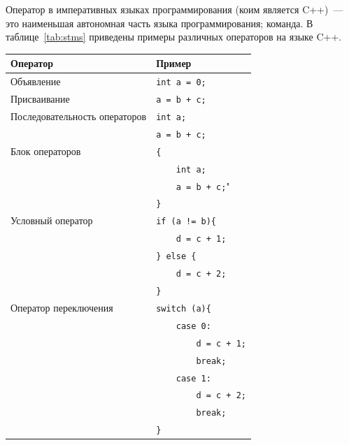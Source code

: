 Оператор в императивных языках программирования (коим является {\sf C++})~--- это наименьшая автономная часть языка программирования; команда. В таблице~\ref{tab:stms} приведены примеры различных операторов на языке {\sf C++}.
\begin{table}
    \begin{center}
        \begin{tabular}{|l|l|}
            \hline
            Оператор & Пример\\
            \hline
            Объявление & \verb"int a = 0;"\\
            \hline
            Присваивание & \verb"a = b + c;" \\
            \hline
            Последовательность операторов & \verb"int a;" \\
                                          & \verb"a = b + c;"\\
            \hline
            Блок операторов &\verb"{" \\
                            &\verb"    int a;" \\
                            &\verb"    a = b + c;"" \\
                            &\verb"}" \\
            \hline
            Условный оператор & \verb"if (a != b){" \\
                              & \verb"    d = c + 1;" \\
                              & \verb"} else {" \\
                              & \verb"    d = c + 2;" \\
                              & \verb"}"\\
            \hline
            Оператор переключения & \verb"switch (a){" \\
                                  & \verb"    case 0:" \\
                                  & \verb"        d = c + 1;" \\
                                  & \verb"        break;" \\
                                  & \verb"    case 1:" \\
                                  & \verb"        d = c + 2;" \\
                                  & \verb"        break;" \\
                                  & \verb"}"\\
            \hline

\end{tabular}
\end{center}
\end{table}
